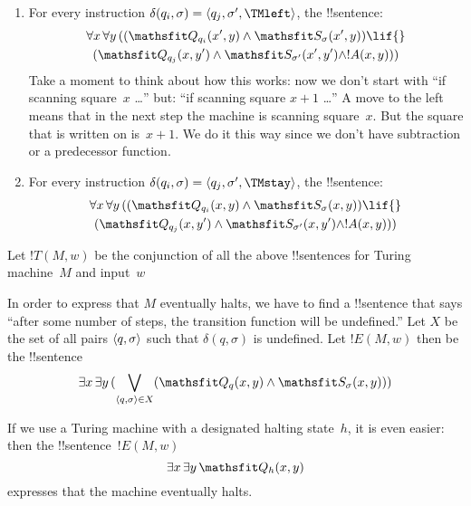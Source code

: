 \documentclass[../../../include/open-logic-section]{subfiles}
\begin{document}
\begin{enumerate}
\begin{enumerate}
\item {} For every instruction $\delta(q_i, \sigma) =
  \tuple{q_j, \sigma', \TMleft}$, the !!{sentence}:
\begin{multline*}
\lforall[x][\lforall[y][
    ((\Obj Q_{q_i}(x', y) \land \Obj S_{\sigma}(x', y)) \lif {}]]\\
   (\Obj Q_{q_j}(x, y') \land \Obj S_{\sigma'}(x', y') \land
!A(x, y)))
\end{multline*}
Take a moment to think about how this works: now we don't start with
``if scanning square~$x$ \dots'' but: ``if scanning square $x+1$
\dots'' A move to the left means that in the next step the machine is
scanning square~$x$.  But the square that is written on is~$x+1$.  We
do it this way since we don't have subtraction or a predecessor
function.
\item {} For every instruction $\delta(q_i, \sigma) =
  \tuple{q_j, \sigma', \TMstay}$, the !!{sentence}:
\begin{multline*}
\lforall[x][\lforall[y][(
   (\Obj Q_{q_i}(x, y) \land \Obj S_{\sigma}(x, y)) \lif {}]] \\
   (\Obj Q_{q_j}(x, y') \land \Obj S_{\sigma'}(x, y') \land
!A(x, y)))
\end{multline*}
\end{enumerate}
\end{enumerate}
Let $!T(M, w)$ be the conjunction of all the above !!{sentence}s for Turing
machine~$M$ and input~$w$

In order to express that $M$ eventually halts, we have to find a
!!{sentence} that says ``after some number of steps, the transition
function will be undefined.''  Let $X$ be the set of all pairs
$\langle q, \sigma \rangle$ such that $\delta(q, \sigma)$ is undefined.  Let
$!E(M, w)$ then be the !!{sentence}
\[
\lexists[x][\lexists[y][(\bigvee_{\tuple{q, \sigma} \in
      X}(\Obj Q_q(x, y) \land \Obj S_\sigma(x, y)))]]
\]

If we use a Turing machine with a designated halting state~$h$, it
is even easier: then the !!{sentence}~$!E(M, w)$
\[
\lexists[x][\lexists[y][\Obj Q_h(x, y)]]
\]
expresses that the machine eventually halts.
\end{document}
